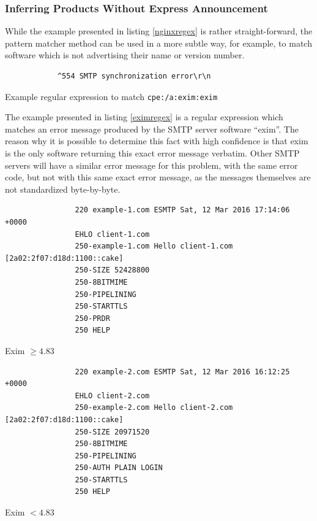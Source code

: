 \documentclass[a4paper,12pt]{article}
\begin{document}
\subsubsection{Inferring Products Without Express Announcement} \label{infernoname}
 
	
	While the example presented in listing \ref{nginxregex} is rather straight-forward, the pattern matcher method can be used in a more subtle way, for example, to match software which is not advertising their name or version number.
	
	\begin{listing}[H]
		\begin{verbatim}
			^554 SMTP synchronization error\r\n
		\end{verbatim}
		\caption{Example regular expression to match \texttt{cpe:/a:exim:exim}}
		\label{eximregex}
	\end{listing}
	
	The example presented in listing \ref{eximregex} is a regular expression which matches an error message produced by the SMTP server software ``exim''. The reason why it is possible to determine this fact with high confidence is that exim is the only software returning this exact error message verbatim. Other SMTP servers will have a similar error message for this problem, with the same error code, but not with this same exact error message, as the messages themselves are not standardized byte-by-byte.
	
	\begin{multicols}{2}
		\begin{listing}[H]
			\begin{verbatim}
				220 example-1.com ESMTP Sat, 12 Mar 2016 17:14:06 +0000
				EHLO client-1.com
				250-example-1.com Hello client-1.com [2a02:2f07:d18d:1100::cake]
				250-SIZE 52428800
				250-8BITMIME
				250-PIPELINING
				250-STARTTLS
				250-PRDR
				250 HELP
			\end{verbatim}
			\caption{Exim $\ge 4.83$}
			\label{eximwiprdr}
		\end{listing}
		\begin{listing}[H]
			\begin{verbatim}
				220 example-2.com ESMTP Sat, 12 Mar 2016 16:12:25 +0000
				EHLO client-2.com
				250-example-2.com Hello client-2.com [2a02:2f07:d18d:1100::cake]
				250-SIZE 20971520
				250-8BITMIME
				250-PIPELINING
				250-AUTH PLAIN LOGIN
				250-STARTTLS
				250 HELP
			\end{verbatim}
			\caption{Exim $< 4.83$}
			\label{eximwoprdr}
		\end{listing}
	\end{multicols}
	
\end{document}
